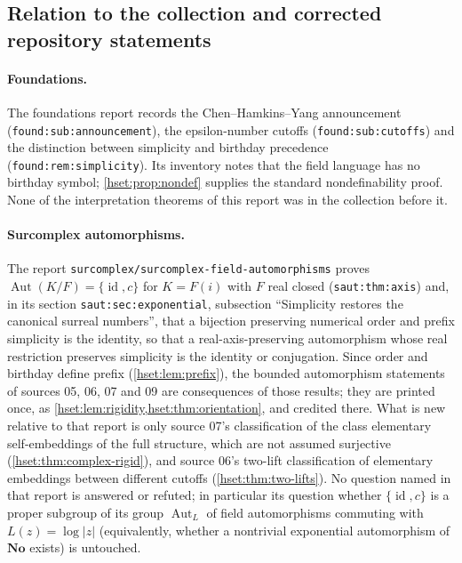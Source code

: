 \documentclass[11pt,letterpaper]{article}
\theoremstyle{definition}
\theoremstyle{remark}
\newcommand{\No}{\mathbf{No}}
\newcommand{\id}{\operatorname{id}}
\newcommand{\Aut}{\operatorname{Aut}}
\newcommand{\lbl}[1]{\nolinkurl{#1}}
\newcommand{\repo}[1]{\nolinkurl{#1}}
\begin{document}
\subsection{Relation to the collection and corrected repository statements}
\label{hset:sub:repo}

\paragraph{Foundations.} The foundations report records the Chen--Hamkins--Yang
announcement (\lbl{found:sub:announcement}), the epsilon-number cutoffs
(\lbl{found:sub:cutoffs}) and the distinction between simplicity and birthday
precedence (\lbl{found:rem:simplicity}). Its inventory notes that the field
language has no birthday symbol; \cref{hset:prop:nondef} supplies the standard
nondefinability proof. None of the interpretation theorems of this report was
in the collection before it.

\paragraph{Surcomplex automorphisms.} The report
\repo{surcomplex/surcomplex-field-automorphisms} proves $\Aut(K/F)=\{\id,c\}$
for $K=F(i)$ with $F$ real closed (\lbl{saut:thm:axis}) and, in its section
\lbl{saut:sec:exponential}, subsection ``Simplicity restores the canonical
surreal numbers'', that a bijection preserving numerical order and prefix
simplicity is the identity, so that a real-axis-preserving automorphism whose
real restriction preserves simplicity is the identity or conjugation. Since
order and birthday define prefix (\cref{hset:lem:prefix}), the bounded
automorphism statements of sources 05, 06, 07 and 09 are consequences of those
results; they are printed once, as \cref{hset:lem:rigidity,hset:thm:orientation},
and credited there. What is new relative to that report is only source 07's
classification of the class elementary self-embeddings of the full structure,
which are not assumed surjective (\cref{hset:thm:complex-rigid}), and source 06's
two-lift classification of elementary embeddings between different cutoffs
(\cref{hset:thm:two-lifts}). No question named in that report is answered or
refuted; in particular its question whether $\{\id,c\}$ is a proper subgroup of
its group $\operatorname{Aut}_L$ of field automorphisms commuting with
$L(z)=\log\lvert z\rvert$ (equivalently, whether a nontrivial exponential
automorphism of $\No$ exists) is untouched.
\end{document}
